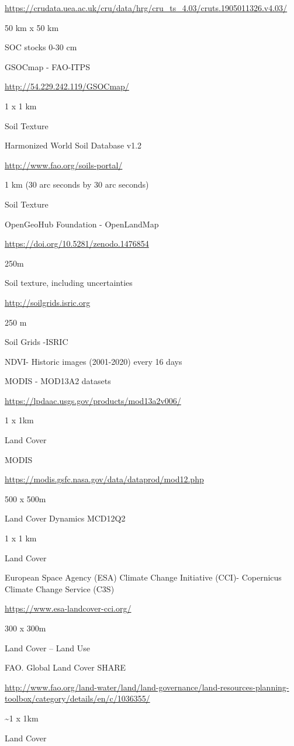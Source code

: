 \documentclass[
  10pt,
  b5paper,
]{book}
\begin{document}
\url{https://crudata.uea.ac.uk/cru/data/hrg/cru_ts_4.03/cruts.1905011326.v4.03/}

50 km x 50 km

SOC stocks 0-30 cm

GSOCmap - FAO-ITPS

\url{http://54.229.242.119/GSOCmap/}

1 x 1 km

Soil Texture

Harmonized World Soil Database v1.2

\url{http://www.fao.org/soils-portal/}

1 km (30 arc seconds by 30 arc seconds)

Soil Texture

OpenGeoHub Foundation - OpenLandMap

\url{https://doi.org/10.5281/zenodo.1476854}

250m

Soil texture, including uncertainties

\url{http://soilgrids.isric.org}

250 m

Soil Grids -ISRIC

NDVI- Historic images (2001-2020) every 16 days

MODIS - MOD13A2 datasets

\url{https://lpdaac.usgs.gov/products/mod13a2v006/}

1 x 1km

Land Cover

MODIS

\url{https://modis.gsfc.nasa.gov/data/dataprod/mod12.php}

500 x 500m

Land Cover Dynamics MCD12Q2

1 x 1 km

Land Cover

European Space Agency (ESA) Climate Change Initiative (CCI)- Copernicus Climate Change Service (C3S)

\url{https://www.esa-landcover-cci.org/}

300 x 300m

Land Cover -- Land Use

FAO. Global Land Cover SHARE

\url{http://www.fao.org/land-water/land/land-governance/land-resources-planning-toolbox/category/details/en/c/1036355/}

\textasciitilde1 x 1km

Land Cover
\end{document}
